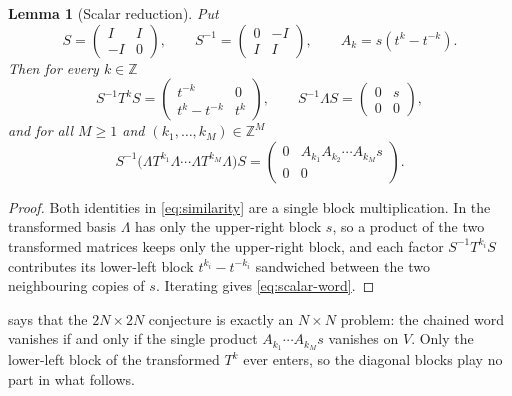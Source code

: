 \documentclass[11pt,reqno]{amsart}
\theoremstyle{plain}
\newtheorem{lemma}[theorem]{Lemma}
\theoremstyle{definition}
\theoremstyle{remark}
\numberwithin{equation}{section}
\begin{document}
\begin{lemma}[Scalar reduction]
\label{lem:reduction}
Put
\begin{equation}
  S=\begin{pmatrix}I&I\\-I&0\end{pmatrix},
  \qquad
  S^{-1}=\begin{pmatrix}0&-I\\I&I\end{pmatrix},
  \qquad
  A_{k}=s(t^{k}-t^{-k}).
  \label{eq:similarity-matrix}
\end{equation}
Then for every $k\in\mathbb{Z}$
\begin{equation}
  S^{-1}T^{k}S=
  \begin{pmatrix}t^{-k}&0\\t^{k}-t^{-k}&t^{k}\end{pmatrix},
  \qquad
  S^{-1}\Lambda S=\begin{pmatrix}0&s\\0&0\end{pmatrix},
  \label{eq:similarity}
\end{equation}
and for all $M\ge1$ and $(k_{1},\dots,k_{M})\in\mathbb{Z}^{M}$
\begin{equation}
  S^{-1}\bigl(\Lambda T^{k_{1}}\Lambda\cdots\Lambda T^{k_{M}}\Lambda\bigr)S
  =\begin{pmatrix}0&A_{k_{1}}A_{k_{2}}\cdots A_{k_{M}}s\\0&0\end{pmatrix}.
  \label{eq:scalar-word}
\end{equation}
\end{lemma}

\begin{proof}
Both identities in \cref{eq:similarity} are a single block multiplication.
In the transformed basis $\Lambda$ has only the upper-right block $s$, so a
product of the two transformed matrices keeps only the upper-right block, and
each factor $S^{-1}T^{k_{i}}S$ contributes its lower-left block $t^{k_{i}}-t^{-k_{i}}$
sandwiched between the two neighbouring copies of $s$. Iterating gives
\cref{eq:scalar-word}.
\end{proof}

 says that the $2N\times2N$ conjecture is exactly an
$N\times N$ problem: the chained word vanishes if and only if the single
product $A_{k_{1}}\cdots A_{k_{M}}s$ vanishes on $V$. Only the lower-left block
of the transformed $T^{k}$ ever enters, so the diagonal blocks play no part in
what follows.
\end{document}
